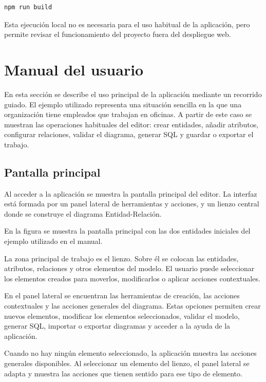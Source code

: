 \begin{verbatim}
npm run build
\end{verbatim}

Esta ejecución local no es necesaria para el uso habitual de la aplicación, pero permite revisar el funcionamiento del proyecto fuera del despliegue web.

\section{Manual del usuario}

En esta sección se describe el uso principal de la aplicación mediante un recorrido guiado. El ejemplo utilizado representa una situación sencilla en la que una organización tiene empleados que trabajan en oficinas. A partir de este caso se muestran las operaciones habituales del editor: crear entidades, añadir atributos, configurar relaciones, validar el diagrama, generar SQL y guardar o exportar el trabajo.

\subsection{Pantalla principal}

Al acceder a la aplicación se muestra la pantalla principal del editor. La interfaz está formada por un panel lateral de herramientas y acciones, y un lienzo central donde se construye el diagrama Entidad-Relación.

En la figura se muestra la pantalla principal con las dos entidades iniciales del ejemplo utilizado en el manual.


La zona principal de trabajo es el lienzo. Sobre él se colocan las entidades, atributos, relaciones y otros elementos del modelo. El usuario puede seleccionar los elementos creados para moverlos, modificarlos o aplicar acciones contextuales.

En el panel lateral se encuentran las herramientas de creación, las acciones contextuales y las acciones generales del diagrama. Estas opciones permiten crear nuevos elementos, modificar los elementos seleccionados, validar el modelo, generar SQL, importar o exportar diagramas y acceder a la ayuda de la aplicación.

Cuando no hay ningún elemento seleccionado, la aplicación muestra las acciones generales disponibles. Al seleccionar un elemento del lienzo, el panel lateral se adapta y muestra las acciones que tienen sentido para ese tipo de elemento.

